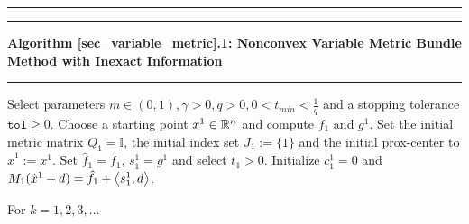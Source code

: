\begin{minipage}\linewidth
\vspace{1em}
\hrule  \vspace{0.4ex} \hrule
\vspace{1ex}
\textbf{Algorithm \ref{sec_variable_metric}.1: Nonconvex Variable Metric Bundle Method with Inexact Information}
\vspace{1ex}
\hrule
\vspace{1ex}
Select parameters \( m \in (0,1), \gamma > 0, q > 0, 0 < t_{min} < \frac{1}{q} \) and a stopping tolerance \( \mathtt{tol} \geq 0\). Choose a starting point \(x^1 \in \mathbb{R}^n\) and compute \(f_1\) and \(g^1\). Set the initial metric matrix \(Q_1 = \mathbb{I}\), the initial index set \(J_1:=\{1\}\) and the initial prox-center to \(\hat{x}^1 := x^1\). Set \(\hat{f}_1 = f_1\), \(s^1_1 = g^1\) and select \(t_1 > 0\). Initialize \(c^1_1 = 0\) and \(M_1(\hat{x}^1+d)=\hat{f}_1+\left\langle s^1_1,d\right\rangle\).
\end{minipage}

For \(k = 1,2,3,  \dotsc \)   

